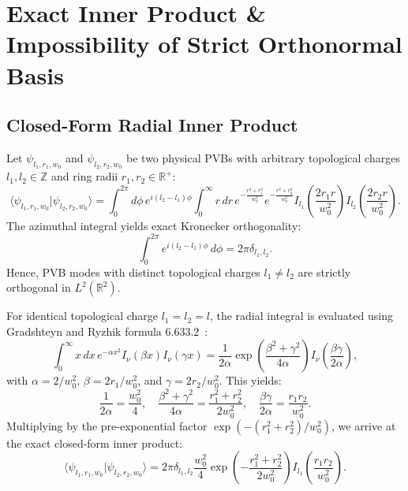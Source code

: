\documentclass{optica-article}
\begin{document}
\section{Exact Inner Product \& Impossibility of Strict Orthonormal Basis}
\label{sec:inner_product}

\subsection{Closed-Form Radial Inner Product}

Let $\psi_{l_1, r_1, w_0}$ and $\psi_{l_2, r_2, w_0}$ be two physical PVBs with arbitrary topological charges $l_1, l_2 \in \mathbb{Z}$ and ring radii $r_1, r_2 \in \mathbb{R}^+$:
\begin{equation}
\langle \psi_{l_1, r_1, w_0} | \psi_{l_2, r_2, w_0} \rangle = \int_0^{2\pi} d\phi \, e^{i(l_2 - l_1)\phi} \int_0^\infty r \, dr \, e^{-\frac{r^2 + r_1^2}{w_0^2}} e^{-\frac{r^2 + r_2^2}{w_0^2}} I_{l_1}\left( \frac{2 r_1 r}{w_0^2} \right) I_{l_2}\left( \frac{2 r_2 r}{w_0^2} \right).
\end{equation}
The azimuthal integral yields exact Kronecker orthogonality:
\begin{equation}
\int_0^{2\pi} e^{i(l_2 - l_1)\phi} \, d\phi = 2\pi \delta_{l_1, l_2}.
\end{equation}
Hence, PVB modes with distinct topological charges $l_1 \neq l_2$ are strictly orthogonal in $L^2(\mathbb{R}^2)$.

For identical topological charge $l_1 = l_2 = l$, the radial integral is evaluated using Gradshteyn and Ryzhik formula 6.633.2~\cite{Gradshteyn2014}:
\begin{equation}
\int_0^\infty x \, dx \, e^{-\alpha x^2} I_\nu(\beta x) I_\nu(\gamma x) = \frac{1}{2\alpha} \exp\left( \frac{\beta^2 + \gamma^2}{4\alpha} \right) I_\nu\left( \frac{\beta \gamma}{2\alpha} \right),
\end{equation}
with $\alpha = 2 / w_0^2$, $\beta = 2 r_1 / w_0^2$, and $\gamma = 2 r_2 / w_0^2$. This yields:
\begin{equation}
\frac{1}{2\alpha} = \frac{w_0^2}{4}, \quad \frac{\beta^2 + \gamma^2}{4\alpha} = \frac{r_1^2 + r_2^2}{2 w_0^2}, \quad \frac{\beta \gamma}{2\alpha} = \frac{r_1 r_2}{w_0^2}.
\end{equation}
Multiplying by the pre-exponential factor $\exp(-(r_1^2 + r_2^2)/w_0^2)$, we arrive at the exact closed-form inner product:
\begin{equation}
\boxed{\langle \psi_{l_1, r_1, w_0} | \psi_{l_2, r_2, w_0} \rangle = 2\pi \delta_{l_1, l_2} \frac{w_0^2}{4} \exp\left( - \frac{r_1^2 + r_2^2}{2 w_0^2} \right) I_{l_1}\left( \frac{r_1 r_2}{w_0^2} \right).}
\label{eq:exact_inner_product}
\end{equation}
\end{document}
